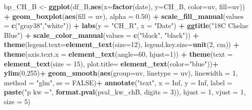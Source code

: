 \documentclass[
]{article}
\newenvironment{Shaded}{\begin{snugshade}}{\end{snugshade}}
\newcommand{\AttributeTok}[1]{\textcolor[rgb]{0.13,0.29,0.53}{#1}}
\newcommand{\ConstantTok}[1]{\textcolor[rgb]{0.56,0.35,0.01}{#1}}
\newcommand{\DecValTok}[1]{\textcolor[rgb]{0.00,0.00,0.81}{#1}}
\newcommand{\FloatTok}[1]{\textcolor[rgb]{0.00,0.00,0.81}{#1}}
\newcommand{\FunctionTok}[1]{\textcolor[rgb]{0.13,0.29,0.53}{\textbf{#1}}}
\newcommand{\NormalTok}[1]{#1}
\newcommand{\OtherTok}[1]{\textcolor[rgb]{0.56,0.35,0.01}{#1}}
\newcommand{\SpecialCharTok}[1]{\textcolor[rgb]{0.81,0.36,0.00}{\textbf{#1}}}
\newcommand{\StringTok}[1]{\textcolor[rgb]{0.31,0.60,0.02}{#1}}
\begin{document}
\begin{Shaded}
\begin{Highlighting}[]
\NormalTok{bp\_CH\_B }\OtherTok{\textless{}{-}} \FunctionTok{ggplot}\NormalTok{(df\_B,}\FunctionTok{aes}\NormalTok{(}\AttributeTok{x=}\FunctionTok{factor}\NormalTok{(date), }\AttributeTok{y=}\NormalTok{CH\_B, }\AttributeTok{color=}\NormalTok{uv, }\AttributeTok{fill=}\NormalTok{uv)) }\SpecialCharTok{+}
  \FunctionTok{geom\_boxplot}\NormalTok{(}\FunctionTok{aes}\NormalTok{(}\AttributeTok{fill =}\NormalTok{ uv), }\AttributeTok{alpha =} \FloatTok{0.50}\NormalTok{) }\SpecialCharTok{+} 
  \FunctionTok{scale\_fill\_manual}\NormalTok{(}\AttributeTok{values =} \FunctionTok{c}\NormalTok{(}\StringTok{"gray38"}\NormalTok{,}\StringTok{"white"}\NormalTok{)) }\SpecialCharTok{+} 
  \FunctionTok{labs}\NormalTok{(}\AttributeTok{y =} \StringTok{"CH\_R"}\NormalTok{, }\AttributeTok{x =} \StringTok{"Date"}\NormalTok{) }\SpecialCharTok{+} \FunctionTok{ggtitle}\NormalTok{(}\StringTok{"18C Chelae Blue"}\NormalTok{) }\SpecialCharTok{+} 
  \FunctionTok{scale\_color\_manual}\NormalTok{(}\AttributeTok{values =} \FunctionTok{c}\NormalTok{(}\StringTok{"black"}\NormalTok{, }\StringTok{"black"}\NormalTok{)) }\SpecialCharTok{+} 
  \FunctionTok{theme}\NormalTok{(}\AttributeTok{legend.text=}\FunctionTok{element\_text}\NormalTok{(}\AttributeTok{size=}\DecValTok{12}\NormalTok{), }\AttributeTok{legend.key.size=}\FunctionTok{unit}\NormalTok{(}\DecValTok{2}\NormalTok{, }\StringTok{\textquotesingle{}cm\textquotesingle{}}\NormalTok{)) }\SpecialCharTok{+}
  \FunctionTok{theme}\NormalTok{(}\AttributeTok{axis.text.x =} \FunctionTok{element\_text}\NormalTok{(}\AttributeTok{angle=}\DecValTok{60}\NormalTok{, }\AttributeTok{hjust=}\DecValTok{1}\NormalTok{)) }\SpecialCharTok{+}
  \FunctionTok{theme}\NormalTok{(}\AttributeTok{text =} \FunctionTok{element\_text}\NormalTok{(}\AttributeTok{size =} \DecValTok{15}\NormalTok{), }\AttributeTok{plot.title=} \FunctionTok{element\_text}\NormalTok{(}\AttributeTok{color=}\StringTok{"blue"}\NormalTok{))}\SpecialCharTok{+}
  \FunctionTok{ylim}\NormalTok{(}\DecValTok{0}\NormalTok{,}\DecValTok{255}\NormalTok{)}\SpecialCharTok{+}
  \FunctionTok{geom\_smooth}\NormalTok{(}\FunctionTok{aes}\NormalTok{(}\AttributeTok{group=}\NormalTok{uv, }\AttributeTok{linetype =}\NormalTok{ uv), }\AttributeTok{linewidth =} \DecValTok{1}\NormalTok{, }\AttributeTok{method =} \StringTok{"glm"}\NormalTok{, }\AttributeTok{se =} \ConstantTok{FALSE}\NormalTok{)}\SpecialCharTok{+}
  \FunctionTok{annotate}\NormalTok{(}\StringTok{"text"}\NormalTok{, }\AttributeTok{x =} \ConstantTok{Inf}\NormalTok{, }\AttributeTok{y =} \ConstantTok{Inf}\NormalTok{, }
           \AttributeTok{label =} \FunctionTok{paste}\NormalTok{(}\StringTok{"p kw ="}\NormalTok{, }\FunctionTok{format.pval}\NormalTok{(pval\_kw\_chB, }\AttributeTok{digits =} \DecValTok{3}\NormalTok{)),}
           \AttributeTok{hjust =} \DecValTok{1}\NormalTok{, }\AttributeTok{vjust =} \DecValTok{1}\NormalTok{, }\AttributeTok{size =} \DecValTok{5}\NormalTok{)}


\end{Highlighting}
\end{Shaded}
\end{document}
